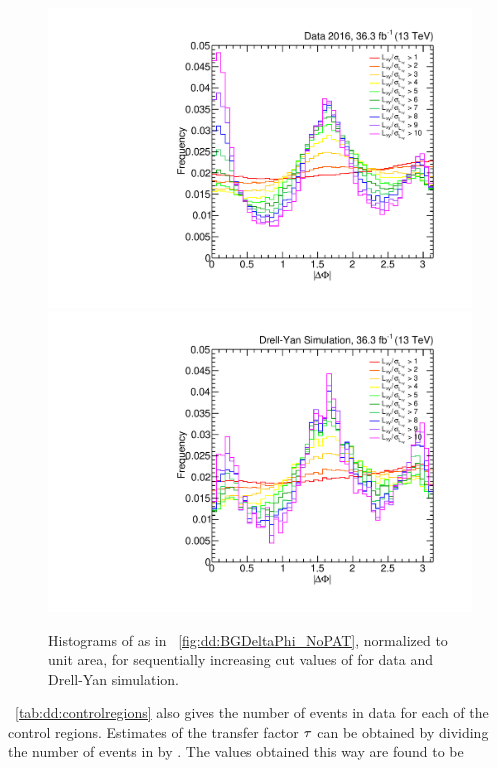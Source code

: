 \begin{figure}[htbp]
  \centering
  \includegraphics[width=\DSquareWidth]{figures/displaced/BGEST_EffectOfLxySigCut_Data.pdf}
  \hspace*{-2em}
  \includegraphics[width=\DSquareWidth]{figures/displaced/BGEST_EffectOfLxySigCut_DY.pdf}
  \caption[Histograms of \DeltaPhi for sequentially increasing cut values of \LxySig in data and Drell-Yan simulation.]{Histograms of \DeltaPhi as in \Fig~\ref{fig:dd:BGDeltaPhi_NoPAT}, normalized to unit area, for sequentially increasing cut values of \LxySig for  data and  Drell-Yan simulation.}
  \label{fig:dd:SeqLxySig}
\end{figure}

\Tab~\ref{tab:dd:controlregions} also gives the number of events in data for each of the control regions.
Estimates of the transfer factor $\tau$ can be obtained by dividing the number of events in  by .
The values obtained this way are found to be

